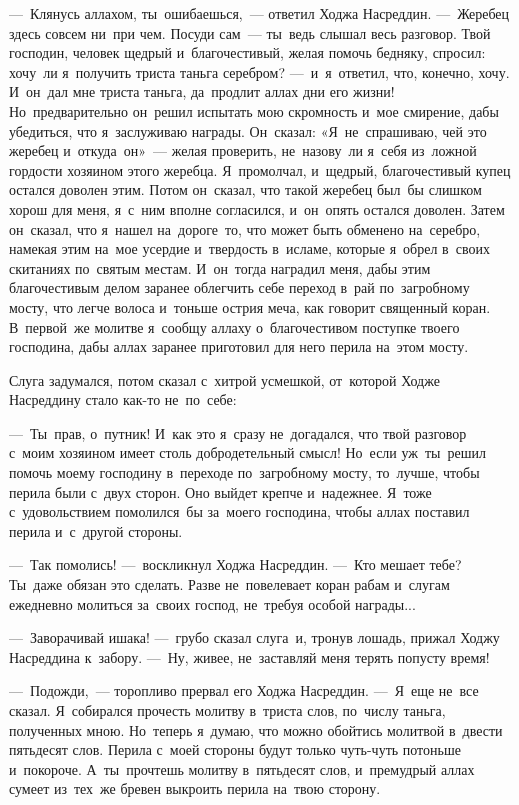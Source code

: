 \documentclass[12pt,a4paper]{book}
\begin{document}
—~Клянусь аллахом, ты~ошибаешься,~— ответил Ходжа Насреддин. —~Жеребец здесь совсем ни~при чем. Посуди сам~— ты~ведь слышал весь разговор. Твой господин, человек щедрый и~благочестивый, желая помочь бедняку, спросил: хочу~ли я~получить триста таньга серебром? —~и~я~ответил, что, конечно, хочу. И~он~дал мне триста таньга, да~продлит аллах дни его жизни! Но~предварительно он~решил испытать мою скромность и~мое смирение, дабы убедиться, что я~заслуживаю награды. Он~сказал: «Я~не~спрашиваю, чей это жеребец и~откуда~он»~— желая проверить, не~назову~ли я~себя из~ложной гордости хозяином этого жеребца. Я~промолчал, и~щедрый, благочестивый купец остался доволен этим. Потом он~сказал, что такой жеребец был~бы слишком хорош для меня, я~с~ним вполне согласился, и~он~опять остался доволен. Затем он~сказал, что я~нашел на~дороге~то, что может быть обменено на~серебро, намекая этим на~мое усердие и~твердость в~исламе, которые я~обрел в~своих скитаниях по~святым местам. И~он~тогда наградил меня, дабы этим благочестивым делом заранее облегчить себе переход в~рай по~загробному мосту, что легче волоса и~тоньше острия меча, как говорит священный коран. В~первой~же молитве я~сообщу аллаху о~благочестивом поступке твоего господина, дабы аллах заранее приготовил для него перила на~этом мосту.

Слуга задумался, потом сказал с~хитрой усмешкой, от~которой Ходже Насреддину стало как-то не~по~себе:

—~Ты~прав, о~путник! И~как это я~сразу не~догадался, что твой разговор с~моим хозяином имеет столь добродетельный смысл! Но~если уж~ты~решил помочь моему господину в~переходе по~загробному мосту, то~лучше, чтобы перила были с~двух сторон. Оно выйдет крепче и~надежнее. Я~тоже с~удовольствием помолился~бы за~моего господина, чтобы аллах поставил перила и~с~другой стороны.

—~Так помолись! —~воскликнул Ходжа Насреддин. —~Кто мешает тебе? Ты~даже обязан это сделать. Разве не~повелевает коран рабам и~слугам ежедневно молиться за~своих господ, не~требуя особой награды...

—~Заворачивай ишака! —~грубо сказал слуга~и, тронув лошадь, прижал Ходжу Насреддина к~забору. —~Ну, живее, не~заставляй меня терять попусту время!

—~Подожди,~— торопливо прервал его Ходжа Насреддин. —~Я~еще не~все сказал. Я~собирался прочесть молитву в~триста слов, по~числу таньга, полученных мною. Но~теперь я~думаю, что можно обойтись молитвой в~двести пятьдесят слов. Перила с~моей стороны будут только чуть-чуть потоньше и~покороче. А~ты~прочтешь молитву в~пятьдесят слов, и~премудрый аллах сумеет из~тех~же бревен выкроить перила на~твою сторону.
\end{document}

